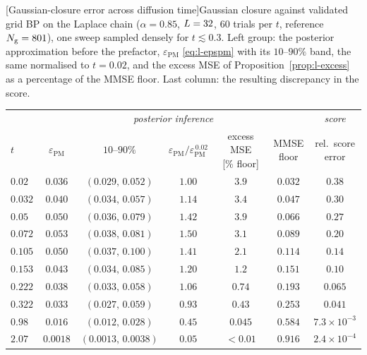 \begin{center}
\begin{minipage}{\linewidth}\centering
{}[Gaussian-closure error across diffusion time]{Gaussian
closure against validated grid BP on the Laplace chain ($\alpha=0.85$,
$L=32$, $60$ trials per $t$, reference $N_{\mathrm{g}}=801$), one sweep
sampled densely for $t\lesssim0.3$. Left group: the posterior approximation
before the prefactor, $\varepsilon_{\mathrm{PM}}$ \eqref{eq:l-epspm} with
its $10$--$90\%$ band, the same normalised to $t=0.02$, and the excess MSE of
Proposition~\ref{prop:l-excess} as a percentage of the MMSE floor. Last
column: the resulting discrepancy in the score.}
\label{tab:l-closure}
\small
\setlength{\tabcolsep}{5pt}
\renewcommand{\arraystretch}{1.1}
\begin{tabular}{@{}lccccc c@{}}
\toprule
& \multicolumn{5}{c}{\textit{posterior inference}}
& \textit{score} \\
\cmidrule(lr){2-6}\cmidrule(l){7-7}
$t$
& $\varepsilon_{\mathrm{PM}}$
& $10$--$90\%$
& $\varepsilon_{\mathrm{PM}}/\varepsilon_{\mathrm{PM}}^{\,0.02}$
& \shortstack{excess MSE\\{}[\% floor]}
& \shortstack{MMSE\\floor}
& \shortstack{rel.\ score\\error} \\
\midrule
$0.02$  & $0.036$  & $(0.029,\,0.052)$   & $1.00$ & $3.9$   & $0.032$ & $0.38$ \\
$0.032$ & $0.040$  & $(0.034,\,0.057)$   & $1.14$ & $3.4$   & $0.047$ & $0.30$ \\
$0.05$  & $0.050$  & $(0.036,\,0.079)$   & $1.42$ & $3.9$   & $0.066$ & $0.27$ \\
$0.072$ & $0.053$  & $(0.038,\,0.081)$   & $\mathbf{1.50}$ & $3.1$ & $0.089$ & $0.20$ \\
$0.105$ & $0.050$  & $(0.037,\,0.100)$   & $1.41$ & $2.1$   & $0.114$ & $0.14$ \\
$0.153$ & $0.043$  & $(0.034,\,0.085)$   & $1.20$ & $1.2$   & $0.151$ & $0.10$ \\
$0.222$ & $0.038$  & $(0.033,\,0.058)$   & $1.06$ & $0.74$  & $0.193$ & $0.065$ \\
$0.322$ & $0.033$  & $(0.027,\,0.059)$   & $0.93$ & $0.43$  & $0.253$ & $0.041$ \\
\addlinespace
$0.98$  & $0.016$  & $(0.012,\,0.028)$   & $0.45$ & $0.045$ & $0.584$ & $7.3\times10^{-3}$ \\
$2.07$  & $0.0018$ & $(0.0013,\,0.0038)$ & $0.05$ & $<0.01$ & $0.916$ & $2.4\times10^{-4}$ \\
\bottomrule
\end{tabular}
\end{minipage}
\end{center}

